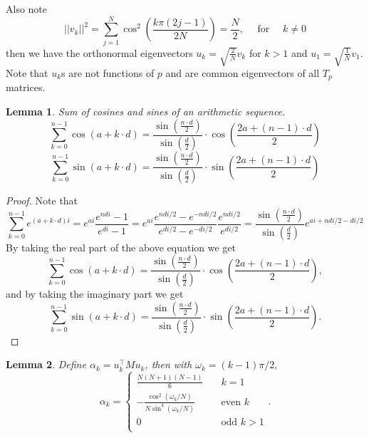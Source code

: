\documentclass[12pt]{article}
\newtheorem{lemma}{Lemma}
\theoremstyle{definition}
\begin{document}
Also note $$
||v_k||^2 = \sum_{j=1}^N \cos ^2\left(\frac{k \pi(2 j-1)}{2 N}\right)=\frac{N}{2}, \quad \text { for } \quad k \neq 0
$$ then we have the orthonormal eigenvectors $u_k = \sqrt{\frac{2}{N}}v_k$ for $k>1$ and $u_1 = \sqrt{\frac{1}{N}}v_1$. Note that $u_k$s are not functions of $p$ and are common eigenvectors of all $T_p$ matrices.
\begin{lemma}
    Sum of cosines and sines of an arithmetic sequence.
    \[
\sum_{k=0}^{n-1} \cos(a + k \cdot d) = \frac{\sin\left(\frac{n \cdot d}{2}\right)}{\sin\left(\frac{d}{2}\right)} \cdot \cos\left(\frac{2a + (n-1) \cdot d}{2}\right)
\]
\[
\sum_{k=0}^{n-1} \sin(a + k \cdot d) = \frac{\sin\left(\frac{n \cdot d}{2}\right)}{\sin\left(\frac{d}{2}\right)} \cdot \sin\left(\frac{2a + (n-1) \cdot d}{2}\right)
\]
\end{lemma}
\begin{proof}
Note that
\[
\sum_{k=0}^{n-1} e^{(a + k \cdot d)i} = e^{ai}\frac{e^{ndi} - 1}{e^{di}-1}= e^{ai}\frac{e^{ndi/2} - e^{-ndi/2}}{e^{di/2}-e^{-di/2}}\frac{e^{ndi/2}}{e^{di/2}} =  \frac{\sin\left(\frac{n \cdot d}{2}\right)}{\sin\left(\frac{d}{2}\right)}e^{ai + ndi/2-di/2}
\]
By taking the real part of the above equation we get
\[
\sum_{k=0}^{n-1} \cos(a + k \cdot d) = \frac{\sin\left(\frac{n \cdot d}{2}\right)}{\sin\left(\frac{d}{2}\right)} \cdot \cos\left(\frac{2a + (n-1) \cdot d}{2}\right),
\]
and by taking the imaginary part we get
\[
\sum_{k=0}^{n-1} \sin(a + k \cdot d) = \frac{\sin\left(\frac{n \cdot d}{2}\right)}{\sin\left(\frac{d}{2}\right)} \cdot \sin\left(\frac{2a + (n-1) \cdot d}{2}\right).
\]
\end{proof}
\begin{lemma}
    Define $\alpha_k = u_k^\top M u_k$, then with $\omega_k=(k-1)\pi/2,$
    $$
\alpha_k = 
\begin{cases}
    \frac{N(N+1)(N-1)}{6} &\quad k = 1\\
    -\frac{\cos^2\left(\omega_k/N\right)}{N\sin^4\left(\omega_k/N\right)}&\quad \text{even } k\\
    0 &\quad \text{odd } k>1\\
\end{cases}.
$$

\end{lemma}
\end{document}
